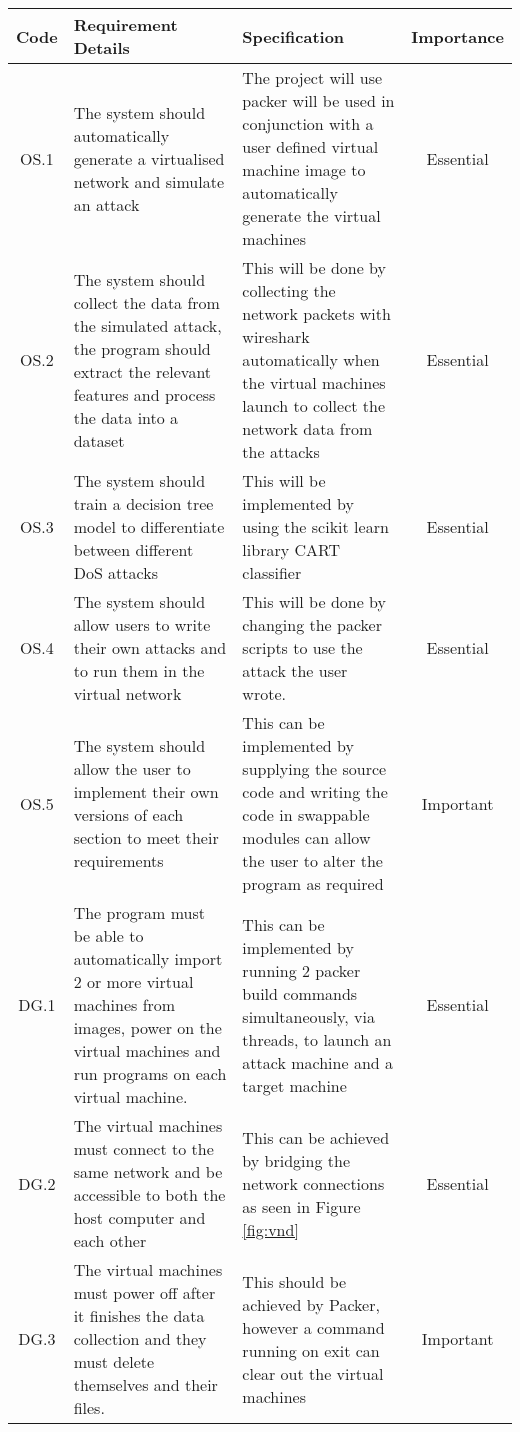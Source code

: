 \begin{tabularx}{\textwidth}{|c|X|X|c|}
 \caption{System Specifications}
 \label{table:req}\\
 \hline
 \textbf{Code}& \textbf{Requirement Details}&\textbf{Specification} &\textbf{Importance}\\
 \hline
 OS.1 & The system should automatically generate a virtualised network and simulate an attack & The project will use packer will be used in conjunction with a user defined virtual machine image to automatically generate the virtual machines & Essential\\
 \hline
 OS.2 & The system should collect the data from the simulated attack, the program should extract the relevant features and process the data into a dataset & This will be done by collecting the network packets with wireshark automatically when the virtual machines launch to collect the network data from the attacks & Essential\\
 \hline
 OS.3 & The system should train a decision tree model to differentiate between different DoS attacks & This will be implemented by using the scikit learn library CART classifier & Essential\\
 \hline
 OS.4 & The system should allow users to write their own attacks and to run them in the virtual network & This will be done by changing the packer scripts to use the attack the user wrote. & Essential \\
 \hline
 OS.5 & The system should allow the user to implement their own versions of each section to meet their requirements & This can be implemented by supplying the source code and writing the code in swappable modules can allow the user to alter the program as required & Important\\ 
 \hline
 DG.1 & The program must be able to automatically import 2 or more virtual machines from images, power on the virtual machines and run programs on each virtual machine. & This can be implemented by running 2 packer build commands simultaneously, via threads, to launch an attack machine and a target machine & Essential\\
 \hline
 DG.2 & The virtual machines must connect to the same network and be accessible to both the host computer and each other & This can be achieved by bridging the network connections as seen in Figure \ref{fig:vnd} & Essential\\
 \hline
 DG.3 & The virtual machines must power off after it finishes the data collection and they must delete themselves and their files. & This should be achieved by Packer, however a command running on exit can clear out the virtual machines & Important\\

\end{tabularx}

